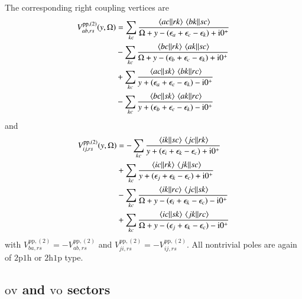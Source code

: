 \documentclass[aip,jcp,reprint,noshowkeys,superscriptaddress]{revtex4-1}
\newcommand{\eps}{\epsilon}
\newcommand{\ii}{\mathrm{i}}
\newcommand{\hhp}{\text{2h1p}}
\newcommand{\pph}{\text{2p1h}}
\newcommand{\pp}{\text{pp}}
\begin{document}
The corresponding right coupling vertices are
\begin{equation}
\begin{split}
V_{ab,rs}^{\pp,(2)}(y,\Omega)
&=
\sum_{kc}
\frac{\mel{ac}{}{rk}\mel{bk}{}{sc}}
{\Omega+y-(\eps_a+\eps_c-\eps_k)+\ii0^+}
\\
& -
\sum_{kc}
\frac{\mel{bc}{}{rk}\mel{ak}{}{sc}}
{\Omega+y-(\eps_b+\eps_c-\eps_k)+\ii0^+}
\\
&+
\sum_{kc}
\frac{\mel{ac}{}{sk}\mel{bk}{}{rc}}
{y+(\eps_a+\eps_c-\eps_k)-\ii0^+}
\\
& -
\sum_{kc}
\frac{\mel{bc}{}{sk}\mel{ak}{}{rc}}
{y+(\eps_b+\eps_c-\eps_k)-\ii0^+}
\end{split}
\label{eq:V_pp_second_ab}
\end{equation}
and
\begin{equation}
\begin{split}
V_{ij,rs}^{\pp,(2)}(y,\Omega)
&=
-
\sum_{kc}
\frac{\mel{ik}{}{sc}\mel{jc}{}{rk}}
{y+(\eps_i+\eps_k-\eps_c)+\ii0^+}
\\
&+
\sum_{kc}
\frac{\mel{ic}{}{rk}\mel{jk}{}{sc}}
{y+(\eps_j+\eps_k-\eps_c)+\ii0^+}
\\
&-
\sum_{kc}
\frac{\mel{ik}{}{rc}\mel{jc}{}{sk}}
{\Omega+y-(\eps_i+\eps_k-\eps_c)-\ii0^+}
\\
&+
\sum_{kc}
\frac{\mel{ic}{}{sk}\mel{jk}{}{rc}}
{\Omega+y-(\eps_j+\eps_k-\eps_c)-\ii0^+}
\end{split}
\label{eq:V_pp_second_ij}
\end{equation}
with
$V_{ba,rs}^{\pp,(2)}=-V_{ab,rs}^{\pp,(2)}$ and
$V_{ji,rs}^{\pp,(2)}=-V_{ij,rs}^{\pp,(2)}$.
All nontrivial poles are again of $\pph$ or $\hhp$ type.

\subsection{$\text{ov}$ and $\text{vo}$ sectors}
\end{document}
